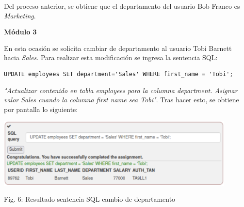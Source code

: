 \documentclass[12pt,oneside,a4paper]{book}
\begin{document}
\begin{enumerate}
\begin{enumerate}
        \vspace{2em}
        
        \hspace{20pt}
        Del proceso anterior, se obtiene que el departamento del usuario Bob Franco es \textit{Marketing}.
        
        \newpage

        \textbf{Módulo 3}
        
        \vspace{1em}

        \hspace{20pt}
        En esta ocasión se solicita cambiar de departamento al usuario Tobi Barnett hacia \textit{Sales}. Para realizar esta modificación se ingresa la sentencia SQL:

        \vspace{1em}

        \begin{verbatim}
UPDATE employees SET department='Sales' WHERE first_name = 'Tobi';
        \end{verbatim}

        \hspace{20pt}
        \textit{"Actualizar contenido en tabla employees para la columna \textit{department}. Asignar valor Sales cuando la columna first name sea Tobi"}. Tras hacer esto, se obtiene por pantalla lo siguiente:

        \vspace{2em}

        \begin{center}
            \includegraphics[width=12cm]{img/sqli3.png}
            
            \vspace{0.1em}
            
            Fig. 6: Resultado sentencia SQL cambio de departamento
        \end{center}
        
        \vspace{2em}


\end{enumerate}
\end{enumerate}
\end{document}
